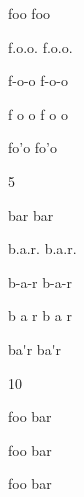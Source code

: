 
\def\mytitle{Abbreviations}













\gls{foo} \gls{foo}

\gls{f.o.o.} \gls{f.o.o.}

f-o-o f-o-o

\gls{f o o} \gls{f o o}

fo'o fo'o

5

\gls{bar} \gls{bar}

\gls{b.a.r.} \gls{b.a.r.}

\gls{b-a-r} \gls{b-a-r}

\gls{b a r} \gls{b a r}

\gls{ba'r} \gls{ba'r}

10

\gls{foo bar}

\gls{foo}
\gls{bar}

\gls{foo} \gls{bar}




